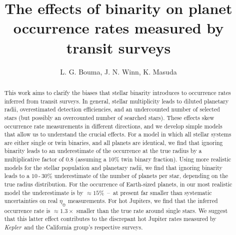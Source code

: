 \documentclass[12pt,modern]{aastex61}
\begin{document}
    
\title{ The effects of binarity on planet occurrence rates measured by transit 
surveys}

\author{
L. G. Bouma, J. N. Winn, K. Masuda
}

\begin{abstract}

This work aims to clarify the biases that stellar binarity introduces
to occurrence rates inferred from transit surveys.
In general, stellar multiplicity leads to diluted planetary 
radii, overestimated detection efficiencies, and an undercounted number of 
selected stars (but possibly an overcounted number of searched stars).
These effects skew occurrence rate measurements in different directions, and 
we develop simple models that allow us to understand the crucial effects.
For a model in which all stellar systems are either single or twin binaries, 
and all planets are identical, we find that ignoring binarity leads to an 
underestimate of the occurrence at the true radius by a multiplicative factor 
of $0.8$ (assuming a 10\% twin binary fraction).
Using more realistic models for the stellar population and planetary 
radii, we find that ignoring binarity leads to a $10$\,-\,$30\%$ 
underestimate of the number of planets per star, depending on the true radius 
distribution.
For the occurrence of Earth-sized planets, in our most realistic model the 
underestimate is by $\approx 15\%$~--~at present far smaller than 
systematic uncertainties on real $\eta_\oplus$ measurements.
For hot Jupiters, we find that the inferred occurrence rate is 
$\approx 1.3\times$ smaller than the true rate around single stars.
We suggest that this latter effect contributes to the discrepant hot Jupiter 
rates measured by {\it Kepler}\ and the California group's respective surveys.
\end{abstract}









\end{document}
